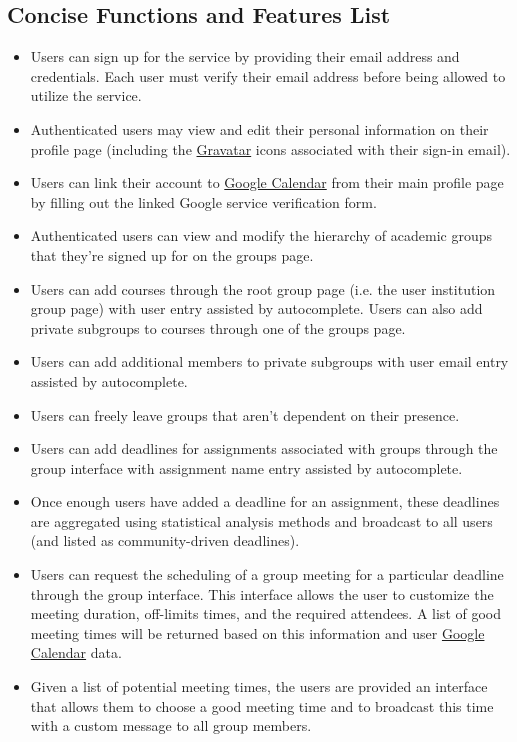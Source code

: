 \documentclass{article}
\newcommand\gcalendar[1][]{\href{https://www.google.com/calendar}{Google Calendar} }
\newcommand\gravatar[1][]{\href{http://en.gravatar.com/}{Gravatar} }
\begin{document}
		\subsection[Feature List]{Concise Functions and Features List}
		\begin{itemize}
			\item Users can sign up for the service by providing their email 
			address and credentials.  Each user must verify their email address 
			before being allowed to utilize the service.

			\item Authenticated users may view and edit their personal information 
			on their profile page (including the \gravatar icons associated with their
			sign-in email).

			\item Users can link their account to \gcalendar from their main
			profile page by filling out the linked Google service verification form.

			\item Authenticated users can view and modify the hierarchy of academic
			groups that they're signed up for on the groups page.

			\item Users can add courses through the root group page (i.e. the
			user institution group page) with user entry assisted by autocomplete.
			Users can also add private subgroups to courses through one of the groups page.

			\item Users can add additional members to private subgroups with
			user email entry assisted by autocomplete.

			\item Users can freely leave groups that aren't dependent on their
			presence.

			\item Users can add deadlines for assignments associated with groups
			through the group interface with assignment name entry assisted by
			autocomplete.

			\item Once enough users have added a deadline for an assignment,
			these deadlines are aggregated using statistical analysis methods
			and broadcast to all users (and listed as community-driven deadlines).

			\item Users can request the scheduling of a group meeting for a
			particular deadline through the group interface.  This interface 
			allows the user to customize the meeting duration, off-limits
			times, and the required attendees.  A list of good meeting times
			will be returned based on this information and user \gcalendar data.
			
			\item Given a list of potential meeting times, the users are
			provided an interface that allows them to choose a good meeting
			time and to broadcast this time with a custom message to all group
			members.
		\end{itemize}
\end{document}
